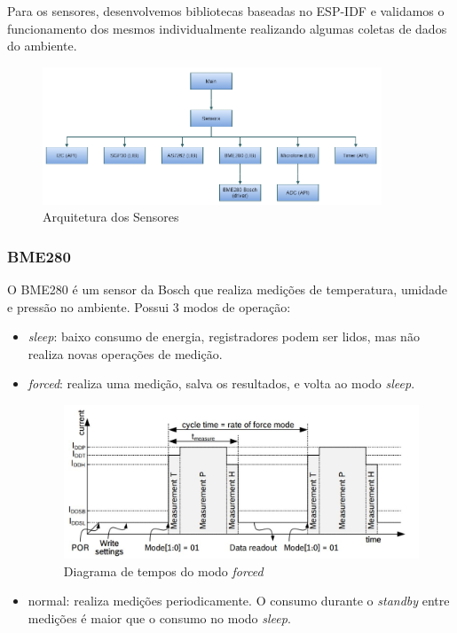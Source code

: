 \documentclass[../monografia.tex]{subfiles}
\begin{document}
Para os sensores, desenvolvemos bibliotecas baseadas no ESP-IDF e validamos o funcionamento dos mesmos individualmente realizando algumas coletas de dados do ambiente. 

\begin{figure}[h]
	\centering
	\includegraphics[width=0.9\textwidth]{sensors-arch}
	\caption{Arquitetura dos Sensores}
	\label{fig:sensors-arch}
\end{figure}

\subsubsection{BME280}

O BME280 é um sensor da Bosch que realiza medições de temperatura, umidade e pressão no ambiente. Possui 3 modos de operação: \cite{bme280}
\begin{itemize}
	\item \textit{sleep}: baixo consumo de energia, registradores podem ser lidos, mas não realiza novas operações de medição.
	\item \textit{forced}: realiza uma medição, salva os resultados, e volta ao modo \textit{sleep}.
	
	\begin{figure}[h]
		\centering
		\includegraphics[width=12cm]{timing_bme280}
		\caption{Diagrama de tempos do modo \textit{forced}}
		\label{fig:time_bme280}
	\end{figure}

	\item normal: realiza medições periodicamente. O consumo durante o \textit{standby} entre medições é maior que o consumo no modo \textit{sleep}. 
\end{itemize}
\end{document}
